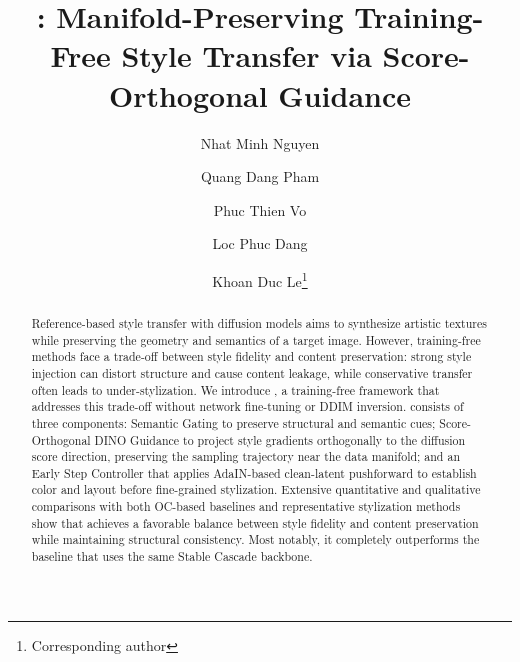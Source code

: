\documentclass[runningheads]{llncs}
\begin{document}
%
\title{\method: Manifold-Preserving Training-Free Style Transfer via Score-Orthogonal Guidance}
%
%
\author{Nhat Minh Nguyen \and
Quang Dang Pham\and
Phuc Thien Vo\and
Loc Phuc Dang\and
Khoan Duc Le\thanks{Corresponding author}}
%
%
%
\maketitle
%
\begin{abstract}
Reference-based style transfer with diffusion models aims to synthesize artistic textures while preserving the geometry and semantics of a target image. However, training-free methods face a trade-off between style fidelity and content preservation: strong style injection can distort structure and cause content leakage, while conservative transfer often leads to under-stylization. We introduce \method, a training-free framework that addresses this trade-off without network fine-tuning or DDIM inversion. \method consists of three components: Semantic Gating to preserve structural and semantic cues; Score-Orthogonal DINO Guidance to project style gradients orthogonally to the diffusion score direction, preserving the sampling trajectory near the data manifold; and an Early Step Controller that applies AdaIN-based clean-latent pushforward to establish color and layout before fine-grained stylization. Extensive quantitative and qualitative comparisons with both OC-based baselines and representative stylization methods show that \method achieves a favorable balance between style fidelity and content preservation while maintaining structural consistency. Most notably, it completely outperforms the baseline that uses the same Stable Cascade backbone.

\end{abstract}











\end{document}
